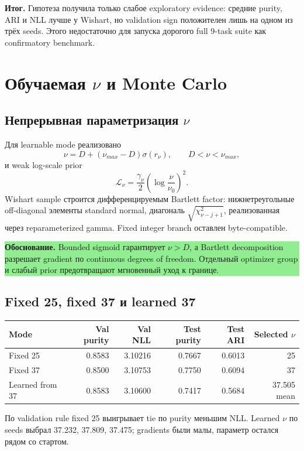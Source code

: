 \documentclass[11pt,a4paper]{article}
\newcommand{\boxnote}[2]{%
  \begin{center}\setlength{\fboxsep}{9pt}%
  \colorbox{#1}{\begin{minipage}{0.94\textwidth}\raggedright #2\par\end{minipage}}
  \end{center}}
\newcommand{\verdict}[1]{\boxnote{lightred}{\textbf{Итог.} #1}}
\newcommand{\rationale}[1]{\boxnote{lightgreen}{\textbf{Обоснование.} #1}}
\begin{document}
\verdict{Гипотеза получила только слабое exploratory evidence: средние purity,
ARI и NLL лучше у Wishart, но validation sign положителен лишь на одном из трёх
seeds. Этого недостаточно для запуска дорогого full 9-task suite как
confirmatory benchmark.}

\section{Обучаемая \texorpdfstring{$\nu$}{nu} и Monte Carlo}

\subsection{Непрерывная параметризация \texorpdfstring{$\nu$}{nu}}

Для learnable mode реализовано
\[
\nu=D+(\nu_{max}-D)\sigma(r_\nu),\qquad D<\nu<\nu_{max},
\]
и weak log-scale prior
\[
\mathcal L_\nu=\frac{\gamma_\nu}{2}
\left(\log\frac{\nu}{\nu_0}\right)^2.
\]
Wishart sample строится дифференцируемым Bartlett factor: нижнетреугольные
off-diagonal элементы standard normal, диагональ
$\sqrt{\chi^2_{\nu-j+1}}$, реализованная через reparameterized gamma. Fixed
integer branch оставлен byte-compatible.

\rationale{Bounded sigmoid гарантирует $\nu>D$, а Bartlett decomposition
разрешает gradient по continuous degrees of freedom. Отдельный optimizer group
и слабый prior предотвращают мгновенный уход к границе.}

\subsection{Fixed 25, fixed 37 и learned 37}

\begin{center}
\begin{tabular}{lrrrrr}
\toprule
Mode & Val purity & Val NLL & Test purity & Test ARI & Selected $\nu$ \\
\midrule
Fixed 25 & 0.8583 & 3.10216 & 0.7667 & 0.6013 & 25 \\
Fixed 37 & 0.8500 & 3.10753 & 0.7750 & 0.6094 & 37 \\
Learned from 37 & 0.8583 & 3.10600 & 0.7417 & 0.5684 & 37.505 mean \\
\bottomrule
\end{tabular}
\end{center}

По validation rule fixed 25 выигрывает tie по purity меньшим NLL. Learned $\nu$
по seeds выбрал 37.232, 37.809, 37.475; gradients были малы, параметр остался
рядом со стартом.
\end{document}
